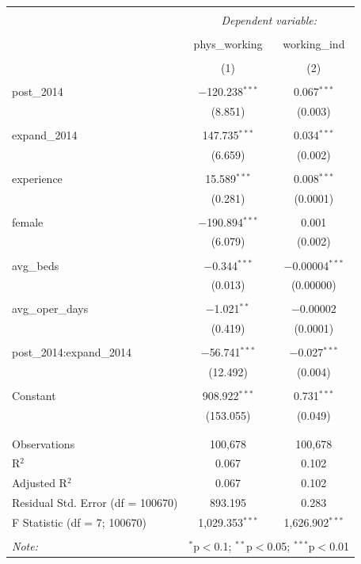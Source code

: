 \documentclass[11pt]{article}
\begin{document}
\begin{table}[!htbp] \centering 
  \caption{} 
  \label{} 
\begin{tabular}{@{\extracolsep{5pt}}lcc} 
\\[-1.8ex]\hline 
\hline \\[-1.8ex] 
 & \multicolumn{2}{c}{\textit{Dependent variable:}} \\ 
\cline{2-3} 
\\[-1.8ex] & phys\_working & working\_ind \\ 
\\[-1.8ex] & (1) & (2)\\ 
\hline \\[-1.8ex] 
 post\_2014 & $-$120.238$^{***}$ & 0.067$^{***}$ \\ 
  & (8.851) & (0.003) \\ 
  & & \\ 
 expand\_2014 & 147.735$^{***}$ & 0.034$^{***}$ \\ 
  & (6.659) & (0.002) \\ 
  & & \\ 
 experience & 15.589$^{***}$ & 0.008$^{***}$ \\ 
  & (0.281) & (0.0001) \\ 
  & & \\ 
 female & $-$190.894$^{***}$ & 0.001 \\ 
  & (6.079) & (0.002) \\ 
  & & \\ 
 avg\_beds & $-$0.344$^{***}$ & $-$0.00004$^{***}$ \\ 
  & (0.013) & (0.00000) \\ 
  & & \\ 
 avg\_oper\_days & $-$1.021$^{**}$ & $-$0.00002 \\ 
  & (0.419) & (0.0001) \\ 
  & & \\ 
 post\_2014:expand\_2014 & $-$56.741$^{***}$ & $-$0.027$^{***}$ \\ 
  & (12.492) & (0.004) \\ 
  & & \\ 
 Constant & 908.922$^{***}$ & 0.731$^{***}$ \\ 
  & (153.055) & (0.049) \\ 
  & & \\ 
\hline \\[-1.8ex] 
Observations & 100,678 & 100,678 \\ 
R$^{2}$ & 0.067 & 0.102 \\ 
Adjusted R$^{2}$ & 0.067 & 0.102 \\ 
Residual Std. Error (df = 100670) & 893.195 & 0.283 \\ 
F Statistic (df = 7; 100670) & 1,029.353$^{***}$ & 1,626.902$^{***}$ \\ 
\hline 
\hline \\[-1.8ex] 
\textit{Note:}  & \multicolumn{2}{r}{$^{*}$p$<$0.1; $^{**}$p$<$0.05; $^{***}$p$<$0.01} \\ 
\end{tabular} 
\end{table} 
\end{document}
